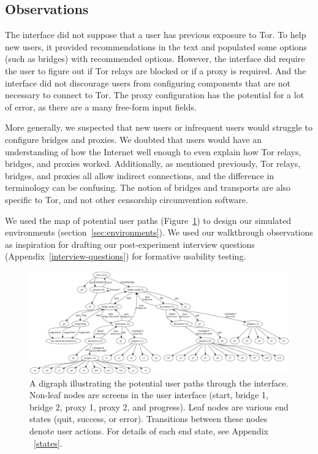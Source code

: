 \documentclass[USenglish,oneside,twocolumn]{article}
\begin{document}
\subsection{Observations}
The interface did not suppose that a user has previous exposure to Tor. To help new users, it provided recommendations in the text and populated some options (such as bridges) with recommended options. However, the interface did require the user to figure out if Tor relays are blocked or if a proxy is required. And the interface did not discourage users from configuring components that are not necessary to connect to Tor. The proxy configuration has the potential for a lot of error, as there are a many free-form input fields. 

More generally, we suspected that new users or infrequent users would struggle to configure bridges and proxies. We doubted that users would have an understanding of how the Internet well enough to even explain how Tor relays, bridges, and proxies worked. Additionally, as mentioned previously, Tor relays, bridges, and proxies all allow indirect connections, and the difference in terminology can be confusing. The notion of bridges and transports are also specific to Tor, and not other censorship circumvention software. 

We used the map of potential user paths (Figure~\ref{fig:digraph}) to design our simulated environments (section~\ref{sec:environments}).  We used our walkthrough observations as inspiration for drafting our post-experiment interview questions (Appendix~\ref{interview-questions}) for formative usability testing. 

\begin{figure}
\centering
\includegraphics[width=\textwidth]{tor-digraph.png}
\caption{
A digraph illustrating the potential user paths through the interface. Non-leaf nodes are screens in the user interface (start, bridge 1, bridge 2, proxy 1, proxy 2, and progress). Leaf nodes are various end states (quit, success, or error). Transitions between these nodes denote user actions. For details of each end state, see Appendix ~\ref{states}. 
}
\label{fig:digraph}
\end{figure} 
\end{document}

